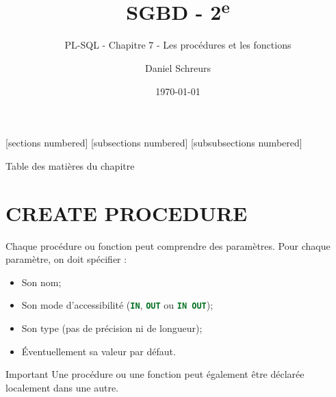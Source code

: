 \documentclass[10pt]{beamer}
\title{SGBD - 2\textsuperscript{e}}
\subtitle{PL-SQL - Chapitre 7 - Les procédures et les fonctions}
\date{\today}
\author{Daniel Schreurs}
\institute{Haute École de Province de Liège}
\begin{document}
\maketitle

[sections numbered]
[subsections numbered]
[subsubsections numbered]
\begin{frame}[allowframebreaks]{Table des matières du chapitre}
    \tableofcontents[subsectionstyle=show/show/hide,subsubsectionstyle=show/show/hide,]
\end{frame}

\section{CREATE PROCEDURE}
\begin{frame}{\secname}
    
\end{frame}



\begin{frame}{\secname}
    Chaque procédure ou fonction peut comprendre des paramètres. Pour chaque paramètre, on doit spécifier :
    \begin{itemize}
        \item Son nom;
        \item Son mode d'accessibilité (\lstinline[language=sql]!IN!, \lstinline[language=sql]!OUT! ou \lstinline[language=sql]!IN OUT!);
        \item Son type (pas de précision ni de longueur);
        \item Éventuellement sa valeur par défaut.
    \end{itemize}
\end{frame}

\begin{frame}{\secname}
    
\end{frame}

\begin{frame}{\secname}
    \begin{alertblock}{Important}
        Une procédure ou une fonction peut également être déclarée localement dans une autre.
    \end{alertblock}
\end{frame}
\end{document}
